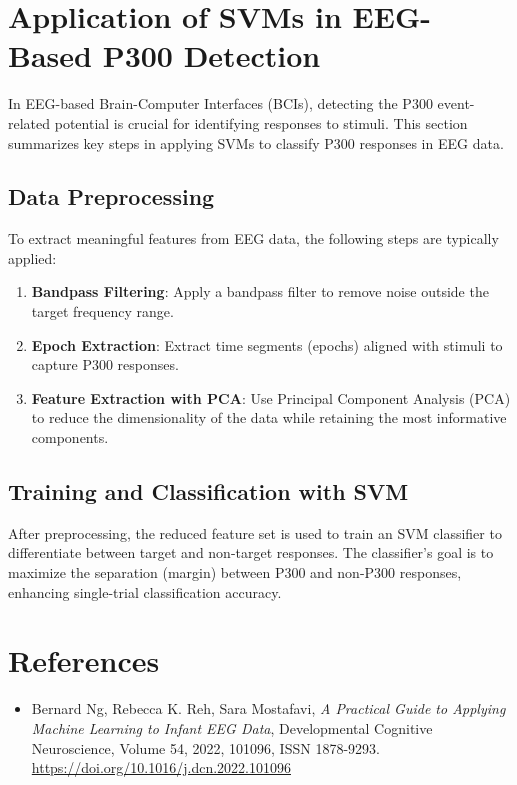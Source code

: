 \documentclass{article}
\begin{document}
\section{Application of SVMs in EEG-Based P300 Detection}
In EEG-based Brain-Computer Interfaces (BCIs), detecting the P300 event-related potential is crucial for identifying responses to stimuli. This section summarizes key steps in applying SVMs to classify P300 responses in EEG data.

\subsection{Data Preprocessing}
To extract meaningful features from EEG data, the following steps are typically applied:
\begin{enumerate}
    \item \textbf{Bandpass Filtering}: Apply a bandpass filter to remove noise outside the target frequency range.
    \item \textbf{Epoch Extraction}: Extract time segments (epochs) aligned with stimuli to capture P300 responses.
    \item \textbf{Feature Extraction with PCA}: Use Principal Component Analysis (PCA) to reduce the dimensionality of the data while retaining the most informative components.
\end{enumerate}

\subsection{Training and Classification with SVM}
After preprocessing, the reduced feature set is used to train an SVM classifier to differentiate between target and non-target responses. The classifier’s goal is to maximize the separation (margin) between P300 and non-P300 responses, enhancing single-trial classification accuracy.

\section{References}
\begin{itemize}
    \item Bernard Ng, Rebecca K. Reh, Sara Mostafavi, \emph{A Practical Guide to Applying Machine Learning to Infant EEG Data}, Developmental Cognitive Neuroscience, Volume 54, 2022, 101096, ISSN 1878-9293. \href{https://doi.org/10.1016/j.dcn.2022.101096}{https://doi.org/10.1016/j.dcn.2022.101096}
\end{itemize}
\end{document}
